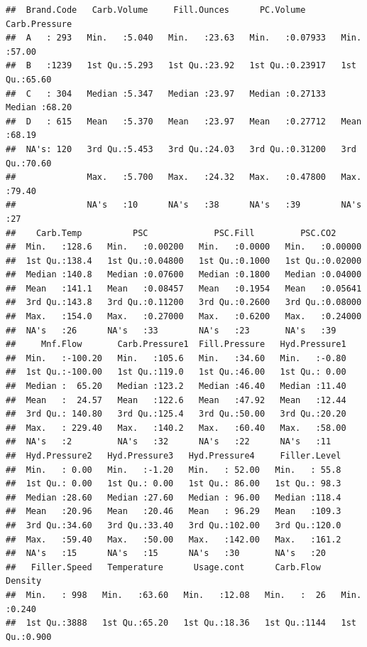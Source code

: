 \documentclass[]{article}
\begin{document}
\begin{verbatim}
##  Brand.Code   Carb.Volume     Fill.Ounces      PC.Volume       Carb.Pressure  
##  A   : 293   Min.   :5.040   Min.   :23.63   Min.   :0.07933   Min.   :57.00  
##  B   :1239   1st Qu.:5.293   1st Qu.:23.92   1st Qu.:0.23917   1st Qu.:65.60  
##  C   : 304   Median :5.347   Median :23.97   Median :0.27133   Median :68.20  
##  D   : 615   Mean   :5.370   Mean   :23.97   Mean   :0.27712   Mean   :68.19  
##  NA's: 120   3rd Qu.:5.453   3rd Qu.:24.03   3rd Qu.:0.31200   3rd Qu.:70.60  
##              Max.   :5.700   Max.   :24.32   Max.   :0.47800   Max.   :79.40  
##              NA's   :10      NA's   :38      NA's   :39        NA's   :27     
##    Carb.Temp          PSC             PSC.Fill         PSC.CO2       
##  Min.   :128.6   Min.   :0.00200   Min.   :0.0000   Min.   :0.00000  
##  1st Qu.:138.4   1st Qu.:0.04800   1st Qu.:0.1000   1st Qu.:0.02000  
##  Median :140.8   Median :0.07600   Median :0.1800   Median :0.04000  
##  Mean   :141.1   Mean   :0.08457   Mean   :0.1954   Mean   :0.05641  
##  3rd Qu.:143.8   3rd Qu.:0.11200   3rd Qu.:0.2600   3rd Qu.:0.08000  
##  Max.   :154.0   Max.   :0.27000   Max.   :0.6200   Max.   :0.24000  
##  NA's   :26      NA's   :33        NA's   :23       NA's   :39       
##     Mnf.Flow       Carb.Pressure1  Fill.Pressure   Hyd.Pressure1  
##  Min.   :-100.20   Min.   :105.6   Min.   :34.60   Min.   :-0.80  
##  1st Qu.:-100.00   1st Qu.:119.0   1st Qu.:46.00   1st Qu.: 0.00  
##  Median :  65.20   Median :123.2   Median :46.40   Median :11.40  
##  Mean   :  24.57   Mean   :122.6   Mean   :47.92   Mean   :12.44  
##  3rd Qu.: 140.80   3rd Qu.:125.4   3rd Qu.:50.00   3rd Qu.:20.20  
##  Max.   : 229.40   Max.   :140.2   Max.   :60.40   Max.   :58.00  
##  NA's   :2         NA's   :32      NA's   :22      NA's   :11     
##  Hyd.Pressure2   Hyd.Pressure3   Hyd.Pressure4     Filler.Level  
##  Min.   : 0.00   Min.   :-1.20   Min.   : 52.00   Min.   : 55.8  
##  1st Qu.: 0.00   1st Qu.: 0.00   1st Qu.: 86.00   1st Qu.: 98.3  
##  Median :28.60   Median :27.60   Median : 96.00   Median :118.4  
##  Mean   :20.96   Mean   :20.46   Mean   : 96.29   Mean   :109.3  
##  3rd Qu.:34.60   3rd Qu.:33.40   3rd Qu.:102.00   3rd Qu.:120.0  
##  Max.   :59.40   Max.   :50.00   Max.   :142.00   Max.   :161.2  
##  NA's   :15      NA's   :15      NA's   :30       NA's   :20     
##   Filler.Speed   Temperature      Usage.cont      Carb.Flow       Density     
##  Min.   : 998   Min.   :63.60   Min.   :12.08   Min.   :  26   Min.   :0.240  
##  1st Qu.:3888   1st Qu.:65.20   1st Qu.:18.36   1st Qu.:1144   1st Qu.:0.900  

\end{verbatim}
\end{document}
